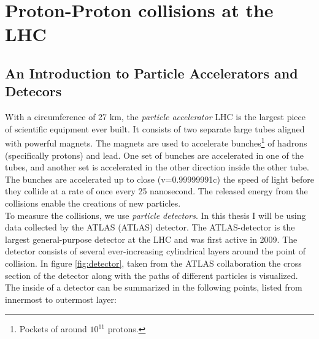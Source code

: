 \section{Proton-Proton collisions at the LHC}
\subsection{An Introduction to Particle Accelerators and Detecors}\label{subsec:Detector}
With a circumference of 27 km, the \emph{particle accelerator} \ac{LHC} is the largest piece of scientific 
equipment ever built. It consists of two separate large tubes aligned with powerful magnets. The magnets are used 
to accelerate bunches\footnote{Pockets of around $10^11$ protons.} of hadrons (specifically protons) and lead. One set 
of bunches are accelerated in one of the tubes, and another set is accelerated in the other direction inside the 
other tube. The bunches are accelerated up to close (v=0.99999991c) the speed of light before they collide at a 
rate of once every 25 nanosecond. The released energy from the collisions enable the creations of new particles.
\\
To measure the collisions, we use \emph{particle detectors}. In this thesis I will be using data collected by the 
\acs{ATLAS} (\acl{ATLAS}) detector. The \ac{ATLAS}-detector is the largest general-purpose detector at the \ac{LHC}
and was first active in 2009. The detector consists of several ever-increasing cylindrical layers around the point of 
collision. In figure \ref{fig:detector}, taken from the \ac{ATLAS} collaboration \cite{PDetector} the cross section 
of the detector along with the paths of different particles is visualized. The inside of a detector can be summarized 
in the following points, listed from innermost to outermost layer:
